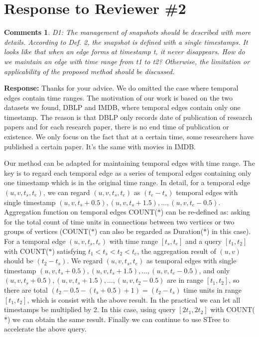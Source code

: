 \documentclass{article}
\newtheorem{Comments}{\textbf{Comments}}
\begin{document}
\section{Response to Reviewer \#2}
\setcounter{Comments}{0}
\begin{Comments}
D1: The management of snapshots should be described with more details. According to Def. 2, the snapshot is defined with a single timestamps. It looks like that when an edge forms at timestamp t, it never disappears. How do we maintain an edge with time range from t1 to t2? Otherwise, the limitation or applicability of the proposed method should be discussed.
\end{Comments}
\noindent \textbf{Response:} Thanks for your advice. We do omitted the case where temporal edges contain time ranges. The motivation of our work is based on the two datasets we found, DBLP and IMDB, where temporal edges contain only one timestamp. The reason is that DBLP only records date of publication of research papers and for each research paper, there is no end time of publication or existence. We only focus on the fact that at a certain time, some researchers have published a certain paper. It's the same with movies in IMDB.

Our method can be adapted for maintaining temporal edges with time range. The key is to regard each temporal edge as a series of temporal edges containing only one timestamp which is in the original time range. In detail, for a temporal edge $ (u,v,t_s,t_e) $, we can regard $ (u,v,t_s,t_e) $ as $ (t_e-t_s) $ temporal edges with single timestamp $ (u,v,t_s+0.5),(u,v,t_s+1.5),...,(u,v,t_e-0.5) $. Aggregation function on temporal edges COUNT($\ast$) can be re-defined as: asking for the total count of time units in connections between two vertices or two groups of vertices (COUNT($\ast$) can also be regarded as Duration($\ast$) in this case). For a temporal edge $ (u,v,t_s,t_e) $ with time range $ [t_s,t_e] $ and a query $ [t_1,t_2] $ with COUNT($\ast$) satisfying $ t_1<t_s<t_2<t_e $, the aggregation result of $ (u,v) $ should be $ (t_2-t_s) $. We regard $ (u,v,t_s,t_e) $ as temporal edges with single timestamp $ (u,v,t_s+0.5),(u,v,t_s+1.5),...,(u,v,t_e-0.5) $, and only $ (u,v,t_s+0.5),(u,v,t_s+1.5),...,(u,v,t_2-0.5) $ are in range $ [t_1,t_2] $, so there are total $ (t_2-0.5-(t_s+0.5)+1)=(t_2-t_s) $ time units in range $ [t_1,t_2] $, which is consist with the above result. In the practical we can let all timestamps be multiplied by 2. In this case, using query $ [2t_1,2t_2] $ with COUNT($\ast$) we can obtain the same result. Finally we can continue to use STree to accelerate the above query.
\end{document}
